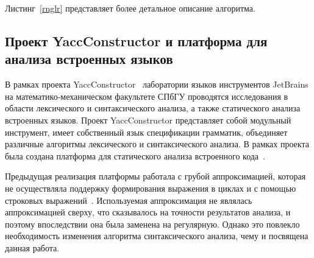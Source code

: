 Листинг~\ref{rnglr} представляет более детальное описание алгоритма.

\subsection{Проект YaccConstructor и платформа для анализа встроенных языков}
В рамках проекта YaccConstructor~\cite{YC} лаборатории языков инструментов JetBrains на математико-механическом факультете СПбГУ проводятся исследования в области лексического и синтаксического анализа, 
а также статического анализа встроенных языков. Проект YaccConstructor представляет собой модульный инструмент, имеет собственный язык спецификации грамматик, объединяет различные алгоритмы лексического и 
синтаксического анализа. В рамках проекта была создана платформа для статического анализа встроенного кода~\cite{SECR14}.

Предыдущая реализация платформы работала с грубой аппроксимацией, которая не осуществляла поддержку формирования выражения в циклах и с помощью строковых выражений~\cite{SECR13}. Используемая аппроксимация 
не являлась аппроксимацией сверху, что сказывалось на точности результатов анализа, и поэтому впоследствии она была заменена на регулярную. Однако это повлекло необходимость изменения алгоритма 
синтаксического анализа, чему и посвящена данная работа. 